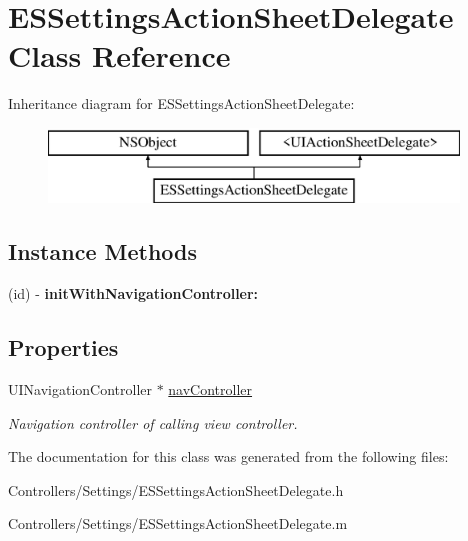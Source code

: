 \hypertarget{interface_e_s_settings_action_sheet_delegate}{}\section{E\+S\+Settings\+Action\+Sheet\+Delegate Class Reference}
\label{interface_e_s_settings_action_sheet_delegate}
Inheritance diagram for E\+S\+Settings\+Action\+Sheet\+Delegate\+:\begin{figure}[H]
\begin{center}
\leavevmode
\includegraphics[height=2.000000cm]{interface_e_s_settings_action_sheet_delegate}
\end{center}
\end{figure}
\subsection*{Instance Methods}
\begin{DoxyCompactItemize}
\item 
\hypertarget{interface_e_s_settings_action_sheet_delegate_ac011c5e69be8e388cb2adc24d2a49f65}{}(id) -\/ {\bfseries init\+With\+Navigation\+Controller\+:}\label{interface_e_s_settings_action_sheet_delegate_ac011c5e69be8e388cb2adc24d2a49f65}

\end{DoxyCompactItemize}
\subsection*{Properties}
\begin{DoxyCompactItemize}
\item 
\hypertarget{interface_e_s_settings_action_sheet_delegate_ad2206623003e2be7bcb97d59895b0e0f}{}U\+I\+Navigation\+Controller $\ast$ \hyperlink{interface_e_s_settings_action_sheet_delegate_ad2206623003e2be7bcb97d59895b0e0f}{nav\+Controller}\label{interface_e_s_settings_action_sheet_delegate_ad2206623003e2be7bcb97d59895b0e0f}

\begin{DoxyCompactList}\small\item\em Navigation controller of calling view controller. \end{DoxyCompactList}\end{DoxyCompactItemize}


The documentation for this class was generated from the following files\+:\begin{DoxyCompactItemize}
\item 
Controllers/\+Settings/E\+S\+Settings\+Action\+Sheet\+Delegate.\+h\item 
Controllers/\+Settings/E\+S\+Settings\+Action\+Sheet\+Delegate.\+m\end{DoxyCompactItemize}
